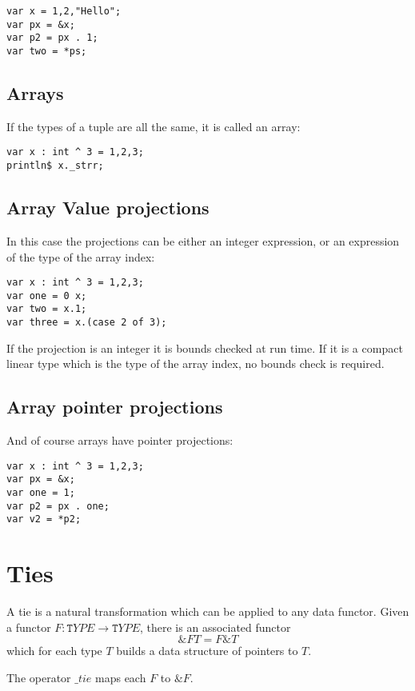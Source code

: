 \documentclass{article}
\begin{document}
\begin{verbatim}
var x = 1,2,"Hello";
var px = &x;
var p2 = px . 1;
var two = *ps;
\end{verbatim}

\subsection{Arrays}
If the types of a tuple are all the same, it is called an array:

\begin{verbatim}
var x : int ^ 3 = 1,2,3;
println$ x._strr;
\end{verbatim}

\subsection{Array Value projections}
In this case the projections can be either an integer expression,
or an expression of the type of the array index:

\begin{verbatim}
var x : int ^ 3 = 1,2,3;
var one = 0 x;
var two = x.1;
var three = x.(case 2 of 3);
\end{verbatim}

If the projection is an integer it is bounds checked at
run time. If it is a compact linear type which is the type
of the array index, no bounds check is required.

\subsection{Array pointer projections}
And of course arrays have pointer projections:

\begin{verbatim}
var x : int ^ 3 = 1,2,3;
var px = &x;
var one = 1;
var p2 = px . one;
var v2 = *p2;
\end{verbatim}

\section{Ties}
A tie is a natural transformation which can be applied to any data functor.
Given a functor $F: {\mathtt TYPE} \rightarrow {\mathtt TYPE}$, there is an associated functor 
$$\&F T = F \&T$$
which for each type $T$ builds a data structure of pointers to $T$.

The operator $\mathrm \_tie$ maps each $F$ to $\&F$. 
\end{document}
